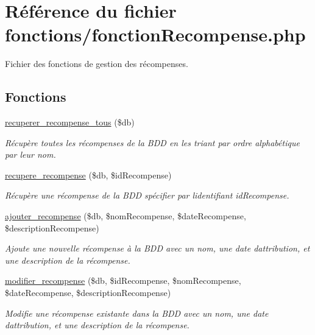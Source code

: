 \hypertarget{fonctionRecompense_8php}{}\section{Référence du fichier fonctions/fonction\+Recompense.php}
\label{fonctionRecompense_8php}


Fichier des fonctions de gestion des récompenses.  


\subsection*{Fonctions}
\begin{DoxyCompactItemize}
\item 
\hyperlink{fonctionRecompense_8php_a6c6e61a81a44c39645205f2699c030c2}{recuperer\+\_\+recompense\+\_\+tous} (\$db)
\begin{DoxyCompactList}\small\item\em Récupère toutes les récompenses de la B\+DD en les triant par ordre alphabétique par leur nom. \end{DoxyCompactList}\item 
\hyperlink{fonctionRecompense_8php_aa58dea1ab39ee8897ef07d8ee8d9771c}{recupere\+\_\+recompense} (\$db, \$id\+Recompense)
\begin{DoxyCompactList}\small\item\em Récupère une récompense de la B\+DD spécifier par l\textquotesingle{}identifiant \textquotesingle{}id\+Recompense\textquotesingle{}. \end{DoxyCompactList}\item 
\hyperlink{fonctionRecompense_8php_adf758bb280917409577ecdee329926dc}{ajouter\+\_\+recompense} (\$db, \$nom\+Recompense, \$date\+Recompense, \$description\+Recompense)
\begin{DoxyCompactList}\small\item\em Ajoute une nouvelle récompense à la B\+DD avec un nom, une date d\textquotesingle{}attribution, et une description de la récompense. \end{DoxyCompactList}\item 
\hyperlink{fonctionRecompense_8php_a9ae2d354d32f27b9f774b95d97e5564e}{modifier\+\_\+recompense} (\$db, \$id\+Recompense, \$nom\+Recompense, \$date\+Recompense, \$description\+Recompense)
\begin{DoxyCompactList}\small\item\em Modifie une récompense existante dans la B\+DD avec un nom, une date d\textquotesingle{}attribution, et une description de la récompense. \end{DoxyCompactList}\item 

\end{DoxyCompactItemize}

